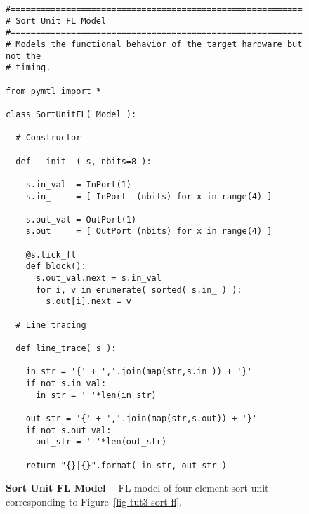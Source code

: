 
\begin{figure}

  \begin{lstlisting}[xleftmargin={0.9in}]
#=========================================================================
# Sort Unit FL Model
#=========================================================================
# Models the functional behavior of the target hardware but not the
# timing.

from pymtl import *

class SortUnitFL( Model ):

  # Constructor

  def __init__( s, nbits=8 ):

    s.in_val  = InPort(1)
    s.in_     = [ InPort  (nbits) for x in range(4) ]

    s.out_val = OutPort(1)
    s.out     = [ OutPort (nbits) for x in range(4) ]

    @s.tick_fl
    def block():
      s.out_val.next = s.in_val
      for i, v in enumerate( sorted( s.in_ ) ):
        s.out[i].next = v

  # Line tracing

  def line_trace( s ):

    in_str = '{' + ','.join(map(str,s.in_)) + '}'
    if not s.in_val:
      in_str = ' '*len(in_str)

    out_str = '{' + ','.join(map(str,s.out)) + '}'
    if not s.out_val:
      out_str = ' '*len(out_str)

    return "{}|{}".format( in_str, out_str )
\end{lstlisting}

  \caption{\textbf{Sort Unit FL Model --} FL model of four-element sort
    unit corresponding to Figure~\ref{fig-tut3-sort-fl}.}
  \label{code-tut3-sort-fl}

\end{figure}

